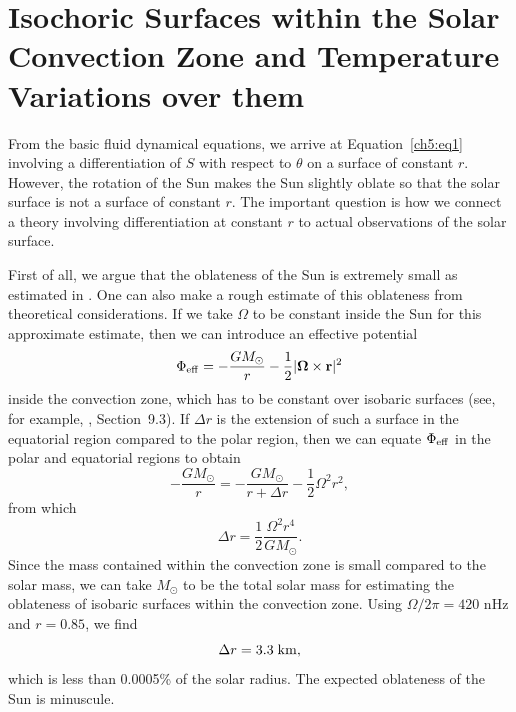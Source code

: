 \chapter[Temperature Variations Over Isochoric Surface]{Isochoric Surfaces within the Solar Convection Zone and Temperature Variations over them}
\label{ch5:appn}
\noindent



From the basic fluid dynamical equations, we arrive at 
Equation~\ref{ch5:eq1}
involving a differentiation of $S$ with respect to $\theta$ on a surface of constant $r$.  However, the rotation of the Sun makes the Sun slightly oblate so that the solar surface is not a surface of constant $r$.  The important question is how we connect a theory involving differentiation at constant $r$ to actual observations of the solar surface.

First of all, we argue that the oblateness of the Sun is extremely small as estimated in \citet{Kuhn2012}. One can also make a rough estimate of this oblateness from theoretical considerations. If we take $\Omega$ to be constant inside the Sun for this approximate estimate, then we can introduce an effective potential
\begin{equation}
 \Phi_{\rm eff} = - \frac{G M_{\odot}}{r} - \frac{1}{2} | {\bf \Omega} \times {\bf r} |^2
 \label{ae1}
\end{equation}
inside the convection zone, which has to be constant over isobaric surfaces (see, for example, \citet{Choudhuri1998book}, Section~9.3). If $\Delta r$ is the extension of such a surface in the equatorial 
region compared to the polar region, then we can equate $\Phi_{\rm eff}$ in the polar and equatorial regions to obtain
%
\begin{equation}
 - \frac{G M_{\odot}}{r} = - \frac{G M_{\odot}}{r + \Delta r} - \frac{1}{2} \Omega^2 r^2,\nonumber
\end{equation}
from which
\begin{equation}
\Delta r = \frac{1}{2} \frac{\Omega^2 r^4}{G M_{\odot}}.
\label{ae2}
\end{equation}
Since the mass contained within the convection zone is small compared to the solar mass, we can
take $M_{\odot}$ to be the total solar mass for estimating the oblateness of isobaric surfaces
within the convection zone.  Using $\Omega/2 \pi = 420$ nHz and $r = 0.85$\Rsun, we find
\begin{equation}
\Delta r = 3.3 \; {\rm km},
\label{ae3}
\end{equation}
which is less than 0.0005\% of the solar radius. The expected oblateness of the Sun is minuscule.


